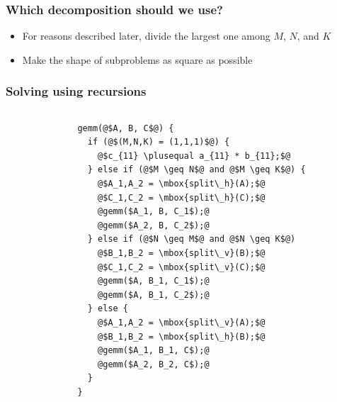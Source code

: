 \documentclass[12pt,dvipdfmx]{beamer}
\newcommand{\plusequal}{\mbox{\tt\ += }}
\begin{document}
\begin{frame}
\frametitle{Which decomposition should we use?}
\begin{itemize}
\item For reasons described later, divide the largest one
among $M$, $N$, and $K$
\item Make the shape of subproblems as square as possible
\end{itemize}
\end{frame}

\begin{frame}[fragile]
\frametitle{Solving using recursions}
\begin{columns}[t]
\begin{column}{0.47\textwidth}

\vskip1.7cm
\begin{center}
\def\svgwidth{\textwidth}
{\small }
\end{center}

\end{column}
\begin{column}{0.43\textwidth}
\begin{lstlisting}[basicstyle=\scriptsize]
gemm(@$A, B, C$@) {
  if (@$(M,N,K) = (1,1,1)$@) {
    @$c_{11} \plusequal a_{11} * b_{11};$@
  } else if (@$M \geq N$@ and @$M \geq K$@) {
    @$A_1,A_2 = \mbox{split\_h}(A);$@
    @$C_1,C_2 = \mbox{split\_h}(C);$@
    @gemm($A_1, B, C_1$);@
    @gemm($A_2, B, C_2$);@
  } else if (@$N \geq M$@ and @$N \geq K$@)
    @$B_1,B_2 = \mbox{split\_v}(B);$@
    @$C_1,C_2 = \mbox{split\_v}(C);$@
    @gemm($A, B_1, C_1$);@
    @gemm($A, B_1, C_2$);@
  } else {
    @$A_1,A_2 = \mbox{split\_v}(A);$@
    @$B_1,B_2 = \mbox{split\_h}(B);$@
    @gemm($A_1, B_1, C$);@
    @gemm($A_2, B_2, C$);@
  }
}
\end{lstlisting}
\end{column}
\end{columns}
\end{frame}

\end{document}
